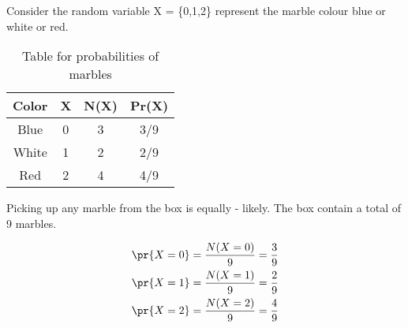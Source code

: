 Consider the random variable X = \{0,1,2\} represent the marble colour blue or white or red.\\
\begin{table}[ht]
\begin{tabular}{|c|c|c|c|}
\hline
\textbf{Color}&\textbf{X}&\textbf{N(X)}&\textbf{Pr(X)}  \\ \hline    
Blue  &0  &3  &3/9  \\ \hline
White  &1  &2  &2/9  \\ \hline
Red  &2  &4  &4/9  \\ \hline
\end{tabular}
\caption{Table for probabilities of marbles}
\label{table:data}
\end{table}
Picking up any marble from the box is equally - likely.
The box contain a total of 9 marbles.

\begin{align}
 \pr{X=0} = \frac{N(X=0)}{9} = \frac{3}{9}\\
 \pr{X=1} = \frac{N(X=1)}{9} = \frac{2}{9}\\
 \pr{X=2} = \frac{N(X=2)}{9} = \frac{4}{9}
\end{align}